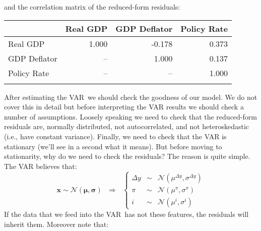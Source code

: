 \documentclass[11pt,a4paper]{report}
\numberwithin{equation}{chapter}
\numberwithin{section}{chapter}
\begin{document}
\noindent and the correlation matrix of the reduced-form residuals:

\begin{center}
\begin{tabular}{lrrr}
\addlinespace \toprule & Real GDP & GDP Deflator & Policy Rate \\ 
\midrule Real GDP & 1.000 & -0.178 & 0.373 \\ 
GDP Deflator & -- & 1.000 & 0.137 \\ 
Policy Rate & -- & -- & 1.000 \\ 
\bottomrule &  &  & 
\end{tabular}%
\end{center}

After estimating the VAR\ we should check the goodness of our model. We do
not cover this in detail but before interpreting the VAR results we should
check a number of assumptions. Loosely speaking we need to check that the
reduced-form residuals are, normally distributed, not autocorrelated, and
not heteroskedastic (i.e., have constant variance). Finally, we need to
check that the VAR is stationary (we'll see in a second what it means). But
before moving to stationarity, why do we need to check the residuals? The
reason is quite simple. The VAR believes that:%
\begin{equation*}
\mathbf{x}\sim \mathcal{N}(\mathbf{\mu },\mathbf{\sigma })\ \ \
\Longrightarrow \ \ \ \left\{ 
\begin{array}{lll}
\Delta y & \sim & \mathcal{N}(\mu ^{\Delta y},\sigma ^{\Delta y}) \\ 
\pi & \sim & \mathcal{N}(\mu ^{\pi },\sigma ^{\pi }) \\ 
i & \sim & \mathcal{N}(\mu ^{i},\sigma ^{i})%
\end{array}%
\right.
\end{equation*}%
If the data that we feed into the VAR\ has not these features, the residuals
will inherit them. Moreover note that:
\end{document}
